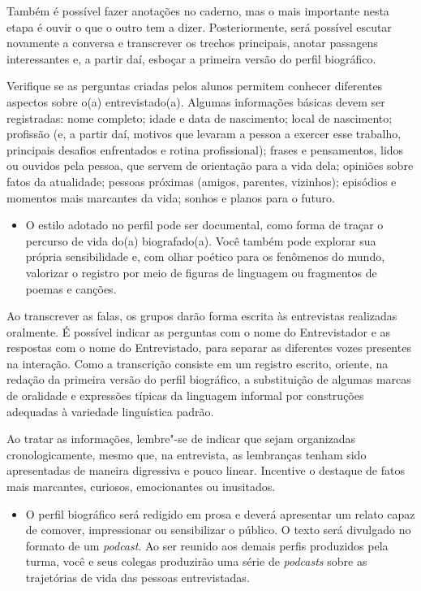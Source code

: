 \documentclass[12pt]{extarticle}
\begin{document}
Também é possível fazer anotações no caderno, mas o mais importante
nesta etapa é ouvir o que o outro tem a dizer. Posteriormente, será
possível escutar novamente a conversa e transcrever os trechos
principais, anotar passagens interessantes e, a partir daí, esboçar a
primeira versão do perfil biográfico.

Verifique se as perguntas criadas pelos alunos permitem conhecer
diferentes aspectos sobre o(a) entrevistado(a). Algumas informações
básicas devem ser registradas: nome completo; idade e data de
nascimento; local de nascimento; profissão (e, a partir daí, motivos que
levaram a pessoa a exercer esse trabalho, principais desafios
enfrentados e rotina profissional); frases e pensamentos, lidos ou
ouvidos pela pessoa, que servem de orientação para a vida dela; opiniões
sobre fatos da atualidade; pessoas próximas (amigos, parentes,
vizinhos); episódios e momentos mais marcantes da vida; sonhos e planos
para o futuro.

\begin{itemize}
\item
  O estilo adotado no perfil pode ser documental, como forma de traçar o
  percurso de vida do(a) biografado(a). Você também pode explorar sua
  própria sensibilidade e, com olhar poético para os fenômenos do mundo,
  valorizar o registro por meio de figuras de linguagem ou fragmentos de
  poemas e canções.
\end{itemize}

Ao transcrever as falas, os grupos darão forma escrita às entrevistas
realizadas oralmente. É possível indicar as perguntas com o nome do
Entrevistador e as respostas com o nome do Entrevistado, para separar as
diferentes vozes presentes na interação. Como a transcrição consiste em
um registro escrito, oriente, na redação da primeira versão do perfil
biográfico, a substituição de algumas marcas de oralidade e expressões
típicas da linguagem informal por construções adequadas à variedade
linguística padrão.

Ao tratar as informações, lembre"-se de indicar que sejam organizadas
cronologicamente, mesmo que, na entrevista, as lembranças tenham sido
apresentadas de maneira digressiva e pouco linear. Incentive o destaque
de fatos mais marcantes, curiosos, emocionantes ou inusitados.

\begin{itemize}
\item
  O perfil biográfico será redigido em prosa e deverá apresentar um
  relato capaz de comover, impressionar ou sensibilizar o público. O
  texto será divulgado no formato de um \emph{podcast}. Ao ser reunido
  aos demais perfis produzidos pela turma, você e seus colegas
  produzirão uma série de \emph{podcasts} sobre as trajetórias de vida
  das pessoas entrevistadas.
\end{itemize}
\end{document}
